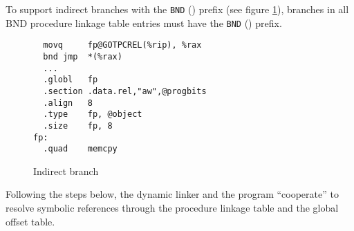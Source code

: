 To support indirect branches with the \texttt{BND} () prefix
(see figure \ref{indirect_branch}), branches in all BND procedure linkage
table entries must have the \texttt{BND} () prefix.

\begin{figure}[H]
\Hrule
\caption{Indirect branch}
\label{indirect_branch}
\begin{footnotesize}
\begin{verbatim}
  movq     fp@GOTPCREL(%rip), %rax
  bnd jmp  *(%rax)
  ...
  .globl   fp
  .section .data.rel,"aw",@progbits
  .align   8
  .type    fp, @object
  .size    fp, 8
fp:
  .quad    memcpy
\end{verbatim}%
\end{footnotesize}
\Hrule
\end{figure}

Following the steps below, the dynamic linker and the program
``cooperate'' to resolve symbolic references through the procedure
linkage table and the global offset table.


